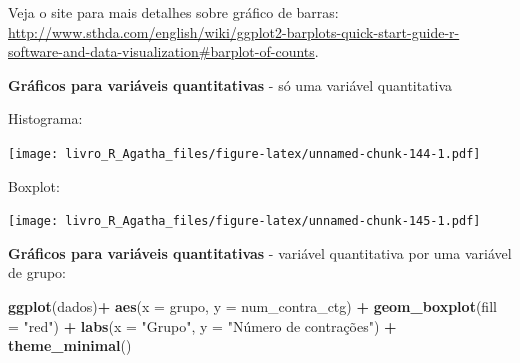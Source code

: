 \documentclass[
]{book}
\newenvironment{Shaded}{\begin{snugshade}}{\end{snugshade}}
\newcommand{\DataTypeTok}[1]{\textcolor[rgb]{0.13,0.29,0.53}{#1}}
\newcommand{\KeywordTok}[1]{\textcolor[rgb]{0.13,0.29,0.53}{\textbf{#1}}}
\newcommand{\NormalTok}[1]{#1}
\newcommand{\OperatorTok}[1]{\textcolor[rgb]{0.81,0.36,0.00}{\textbf{#1}}}
\newcommand{\StringTok}[1]{\textcolor[rgb]{0.31,0.60,0.02}{#1}}
\begin{document}
Veja o site para mais detalhes sobre gráfico de barras:
\url{http://www.sthda.com/english/wiki/ggplot2-barplots-quick-start-guide-r-software-and-data-visualization\#barplot-of-counts}.

\textbf{Gráficos para variáveis quantitativas} - só uma variável quantitativa

Histograma:

\begin{Shaded}
\end{Shaded}

\texttt{[image: livro\_R\_Agatha\_files/figure-latex/unnamed-chunk-144-1.pdf]}

Boxplot:

\begin{Shaded}
\end{Shaded}

\texttt{[image: livro\_R\_Agatha\_files/figure-latex/unnamed-chunk-145-1.pdf]}

\textbf{Gráficos para variáveis quantitativas} - variável quantitativa por uma variável de grupo:

\begin{Shaded}
\begin{Highlighting}[]
\KeywordTok{ggplot}\NormalTok{(dados)}\OperatorTok{+}
\StringTok{  }\KeywordTok{aes}\NormalTok{(}\DataTypeTok{x =}\NormalTok{ grupo, }\DataTypeTok{y =}\NormalTok{ num_contra_ctg) }\OperatorTok{+}
\StringTok{  }\KeywordTok{geom_boxplot}\NormalTok{(}\DataTypeTok{fill =} \StringTok{"red"}\NormalTok{) }\OperatorTok{+}
\StringTok{  }\KeywordTok{labs}\NormalTok{(}\DataTypeTok{x =} \StringTok{"Grupo"}\NormalTok{, }\DataTypeTok{y =} \StringTok{"Número de contrações"}\NormalTok{) }\OperatorTok{+}
\StringTok{  }\KeywordTok{theme_minimal}\NormalTok{()}
\end{Highlighting}
\end{Shaded}
\end{document}
